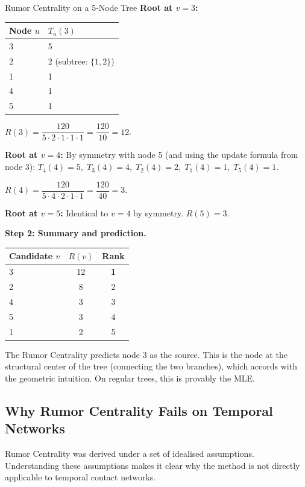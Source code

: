 \begin{examplebox}{Rumor Centrality on a 5-Node Tree}
\medskip
\textbf{Root at $v = 3$:}
\begin{center}
\small
\begin{tabular}{ll}
\toprule
Node $u$ & $T_u(3)$ \\
\midrule
3 & 5 \\
2 & 2 \quad (subtree: $\{1, 2\}$) \\
1 & 1 \\
4 & 1 \\
5 & 1 \\
\bottomrule
\end{tabular}
\end{center}
$R(3) = \dfrac{120}{5 \cdot 2 \cdot 1 \cdot 1 \cdot 1} = \dfrac{120}{10} = 12$.

\medskip
\textbf{Root at $v = 4$:}
By symmetry with node 5 (and using the update formula from node 3):
$T_4(4) = 5,\; T_3(4) = 4,\; T_2(4) = 2,\; T_1(4) = 1,\; T_5(4) = 1$.

$R(4) = \dfrac{120}{5 \cdot 4 \cdot 2 \cdot 1 \cdot 1} = \dfrac{120}{40} = 3$.

\textbf{Root at $v = 5$:} Identical to $v = 4$ by symmetry. $R(5) = 3$.

\medskip
\textbf{Step 2: Summary and prediction.}
\begin{center}
\small
\begin{tabular}{lcc}
\toprule
Candidate $v$ & $R(v)$ & Rank \\
\midrule
3 & 12 & \textbf{1} \\
2 & 8  & 2 \\
4 & 3  & 3 \\
5 & 3  & 4 \\
1 & 2  & 5 \\
\bottomrule
\end{tabular}
\end{center}

The Rumor Centrality predicts node 3 as the source. This is the node at the structural
center of the tree (connecting the two branches), which accords with the geometric
intuition. On regular trees, this is provably the MLE.
\end{examplebox}

\subsection{Why Rumor Centrality Fails on Temporal Networks}

Rumor Centrality was derived under a set of idealised assumptions. Understanding these
assumptions makes it clear why the method is not directly applicable to temporal
contact networks.

